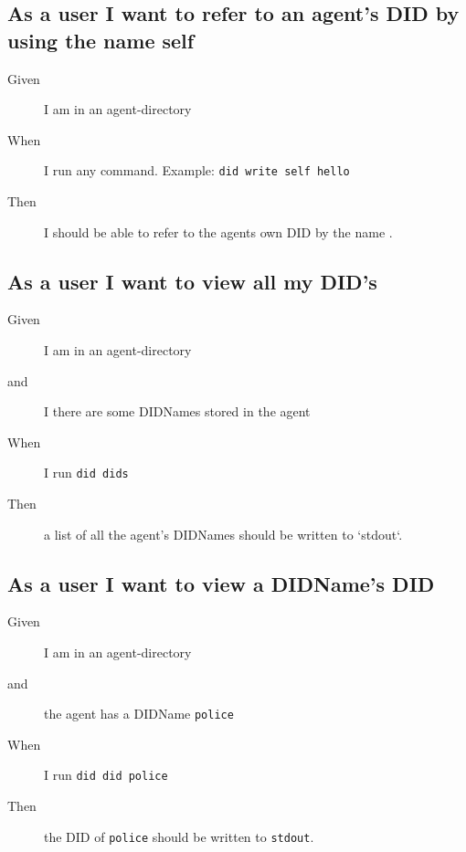 \subsection{As a user I want to refer to an agent's DID by using the name self}
\begin{description}\begin{description}
    \item[Given] I am in an agent-directory
    \item[When] I run any command. Example: \texttt{did write self hello}
    \item[Then] I should be able to refer to the agents own DID by the name .
\end{description}\end{description}


\subsection{As a user I want to view all my DID's}
\begin{description}\begin{description}
    \item[Given] I am in an agent-directory
    \item[and] I there are some DIDNames stored in the agent
    \item[When] I run \texttt{did dids}
    \item[Then] a list of all the agent's DIDNames should be written to `stdout`.
\end{description}\end{description}


\subsection{As a user I want to view a DIDName's DID}
\begin{description}\begin{description}
    \item[Given] I am in an agent-directory
    \item[and] the agent has a DIDName \texttt{police}
    \item[When] I run \texttt{did did police}
    \item[Then] the DID of \texttt{police} should be written to \texttt{stdout}.
\end{description}\end{description}


\newpage

